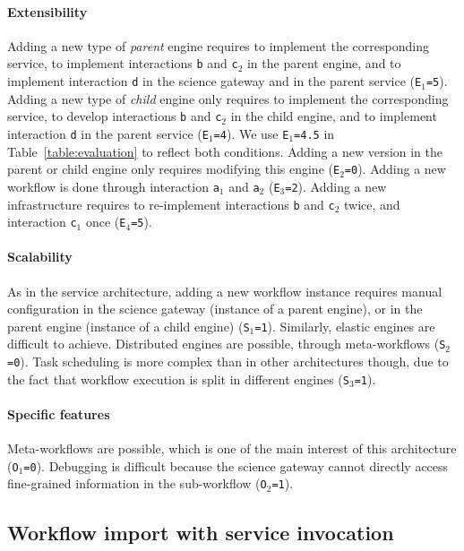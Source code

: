 \documentclass[preprint,3p,twocolumn]{elsarticle}
\begin{document}
\paragraph{Extensibility} Adding a new type of \emph{parent} engine
requires to implement the corresponding service, to implement
interactions \texttt{b} and \texttt{c$_2$} in the parent engine, and
to implement interaction \texttt{d} in the science gateway and in the
parent service (\texttt{E$_1$=5}). Adding a new type of \emph{child}
engine only requires to implement the corresponding service, to
develop interactions \texttt{b} and \texttt{c$_2$} in the child
engine, and to implement interaction \texttt{d} in the parent service
(\texttt{E$_1$=4}). We use \texttt{E$_1$=4.5} in
Table~\ref{table:evaluation} to reflect both conditions. Adding a new
version in the parent or child engine only requires modifying this
engine (\texttt{E$_2$=0}). Adding a new
workflow is done through interaction \texttt{a$_1$} and \texttt{a$_2$}
(\texttt{E$_3$=2}). Adding a new infrastructure requires to
re-implement interactions \texttt{b} and \texttt{c$_2$} twice, and
interaction \texttt{c$_1$} once (\texttt{E$_4$=5}).

\paragraph{Scalability} As in the service architecture, adding a new
workflow instance requires manual configuration in the science gateway
(instance of a parent engine), or in the parent engine (instance of a
child engine) (\texttt{S$_1$=1}). Similarly, elastic engines are
difficult to achieve. Distributed engines are
possible, through meta-workflows (\texttt{S$_2$=0}). Task scheduling
is more complex than in other architectures though, due to the fact
that workflow execution is split in different engines (\texttt{S$_3$=1}).

\paragraph{Specific features}
Meta-workflows are possible, which is one of the main interest of this
architecture (\texttt{O$_1$=0}).  Debugging is difficult because the
science gateway cannot directly access fine-grained information in the
sub-workflow (\texttt{O$_2$=1}).

\subsection{Workflow import with service invocation}
\end{document}
